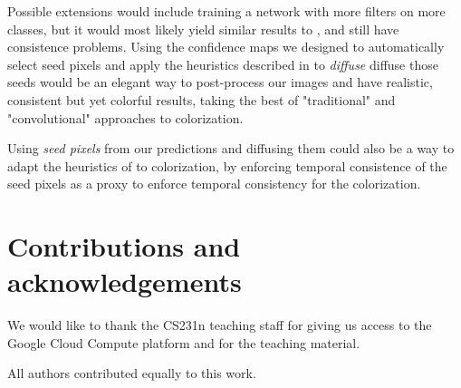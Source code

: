 \documentclass[10pt,twocolumn,letterpaper]{article}
\begin{document}
Possible extensions would include training a network with more filters on more classes, but it would most likely yield similar results to \cite{zhang2016colorful}, and still have consistence problems. Using the confidence maps we designed to automatically select seed pixels and apply the heuristics described in \cite{levin2004colorization} to \textit{diffuse} diffuse those seeds would be an elegant way to post-process our images and have realistic, consistent but yet colorful results, taking the best of "traditional" and "convolutional" approaches to colorization.

Using \textit{seed pixels} from our predictions and diffusing them could also be a way to adapt the heuristics of \cite{zhu2017video} to colorization, by enforcing temporal consistence of the seed pixels as a proxy to enforce temporal consistency for the colorization.


\section*{Contributions and acknowledgements}

We would like to thank the CS231n teaching staff for giving us access to the Google Cloud Compute platform and for the teaching material.

All authors contributed equally to this work.

{\small


}
\end{document}
